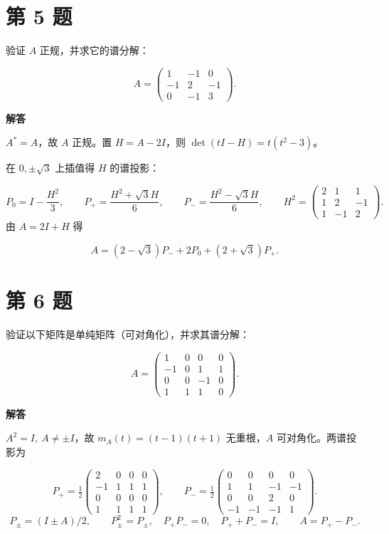 \documentclass[UTF8,10pt,letterpaper,fontset=fandol]{ctexart}
\begin{document}
\section{第 5 题}
验证 $A$ 正规，并求它的谱分解：\par
\[
 A=\begin{pmatrix}1&-1&0\\-1&2&-1\\0&-1&3\end{pmatrix}.
\]
\par{}\textbf{解答}\par
$A^*=A$，故 $A$ 正规。置 $H=A-2I$，则 $\det(tI-H)=t(t^2-3)$。\par
在 $0,\pm\sqrt3$ 上插值得 $H$ 的谱投影：\par
\[
 P_0=I-\frac{H^2}{3},\qquad
 P_+=\frac{H^2+\sqrt3 H}{6},\qquad P_-=\frac{H^2-\sqrt3 H}{6},
 \qquad H^2=\begin{pmatrix}2&1&1\\1&2&-1\\1&-1&2\end{pmatrix}.
\]
由 $A=2I+H$ 得\par
\[\boxed{A=(2-\sqrt3)P_-+2P_0+(2+\sqrt3)P_+}.\]
\section{第 6 题}
验证以下矩阵是单纯矩阵（可对角化），并求其谱分解：\par
\[
 A=\begin{pmatrix}1&0&0&0\\-1&0&1&1\\0&0&-1&0\\1&1&1&0\end{pmatrix}.
\]
\par{}\textbf{解答}\par
$A^2=I,\ A\ne\pm I$，故 $m_A(t)=(t-1)(t+1)$ 无重根，$A$ 可对角化。两谱投影为\par
\[
 P_+=\tfrac12\begin{pmatrix}2&0&0&0\\-1&1&1&1\\0&0&0&0\\1&1&1&1\end{pmatrix},\qquad
 P_-=\tfrac12\begin{pmatrix}0&0&0&0\\1&1&-1&-1\\0&0&2&0\\-1&-1&-1&1\end{pmatrix}.
\]
\[
 P_\pm=(I\pm A)/2,\qquad P_\pm^2=P_\pm,\quad P_+P_-=0,\quad
 P_++P_-=I,\qquad \boxed{A=P_+-P_-}.
\]
\end{document}
